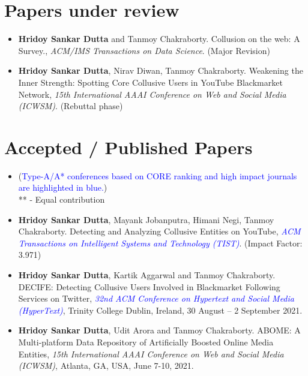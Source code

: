 \documentclass[margin, centered]{res}
\begin{document}
\begin{resume}
\section{Papers under review}
\begin{itemize}[leftmargin=*]

\item \textbf{Hridoy Sankar Dutta} and Tanmoy Chakraborty. Collusion on the web: A Survey.,  \textit{ACM/IMS Transactions on Data Science}.  (Major Revision)

\item \textbf{Hridoy Sankar Dutta}, Nirav Diwan, Tanmoy Chakraborty. Weakening the Inner Strength: Spotting Core Collusive Users in YouTube Blackmarket Network,  \textit{15th International AAAI Conference on Web and Social Media (ICWSM)}.  (Rebuttal phase)


\end{itemize}

\section{Accepted / Published Papers}
\begin{itemize}[leftmargin=*]
\item[] (\textcolor{blue}{Type-A/A* conferences based on CORE ranking and high impact journals are highlighted in blue.}) \\ ** - Equal contribution

\item \textbf{Hridoy Sankar Dutta}, Mayank Jobanputra, Himani Negi, Tanmoy Chakraborty. Detecting and Analyzing Collusive Entities on YouTube,   \textit{\textcolor{blue}{ACM Transactions on Intelligent Systems and Technology (TIST)}}. (Impact Factor: 3.971)

\item \textbf{Hridoy Sankar Dutta}, Kartik Aggarwal and Tanmoy Chakraborty. DECIFE: Detecting Collusive Users Involved in Blackmarket Following Services on Twitter, \textit{\textcolor{blue}{32nd ACM Conference on Hypertext and Social Media (HyperText)}}, Trinity College Dublin, Ireland,  30 August – 2 September 2021.

\item \textbf{Hridoy Sankar Dutta}, Udit Arora and Tanmoy Chakraborty. ABOME: A Multi-platform Data Repository of Artificially Boosted Online Media Entities, \textit{15th International AAAI Conference on Web and Social Media (ICWSM)}, Atlanta, GA, USA, June 7-10, 2021.


\end{itemize}
\end{resume}
\end{document}
